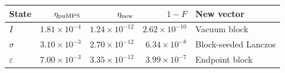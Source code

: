 \begin{tabular}{lrrrl}\toprule
State & $\eta_{\rm puMPS}$ & $\eta_{\rm new}$ & $1-F$ & New vector\\\midrule
$I$ & $1.81\times10^{-4}$ & $1.24\times10^{-12}$ & $2.62\times10^{-10}$ & Vacuum block \\
$\sigma$ & $3.10\times10^{-3}$ & $2.70\times10^{-12}$ & $6.34\times10^{-8}$ & Block-seeded Lanczos \\
$\varepsilon$ & $7.00\times10^{-3}$ & $3.35\times10^{-12}$ & $3.99\times10^{-7}$ & Endpoint block \\
\bottomrule\end{tabular}
